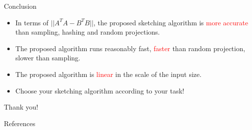 \documentclass[first=dgreen,second=purple,logo=redque]{aaltoslides}
\begin{document}

%
%

\begin{frame}{Conclusion}
\begin{itemize}
  \item In terms of $|| A^TA - B^TB||$, the proposed sketching algorithm is \textcolor{red}{more accurate} than sampling, hashing and random projections.
  \item The proposed algorithm runs reasonably fast, \textcolor{red}{faster} than random projection, slower than sampling.
  \item The proposed algorithm is \textcolor{red}{linear} in the scale of the input size.
  \item Choose your sketching algorithm according to your task!
\end{itemize}
\end{frame}

\begin{frame}{}
Thank you!
\end{frame}



\begin{frame}[allowframebreaks=1]{References}
\small

\end{frame}
\end{document}
